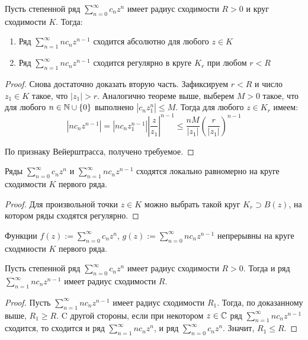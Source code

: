 \begin{proposition}
	Пусть степенной ряд $\sum_{n=0}^\infty c_nz^n$ имеет радиус сходимости $R > 0$ и круг сходимости $K$. Тогда:
	\begin{enumerate}
		\item Ряд $\sum_{n = 1}^\infty nc_nz^{n-1}$ сходится абсолютно для любого $z \in K$
		\item Ряд $\sum_{n = 1}^\infty nc_nz^{n-1}$ сходится регулярно в круге $K_r$ при любом $r < R$
	\end{enumerate}
\end{proposition}

\begin{proof}
	Снова достаточно доказать вторую часть. Зафиксируем $r < R$ и число $z_1 \in K$ такое, что $|z_1| > r$. Аналогично теореме выше, выберем $M > 0$ такое, что для любого $n \in \mathbb{N} \cup \{0\}$ выполнено $|c_nz_1^n| \le M$. Тогда для любого $z \in K_r$ имеем:
	\[\left|nc_nz^{n-1}\right| = \left|nc_nz_1^{n-1}\right|\left|\frac{z}{z_1}\right|^{n-1} \le \frac{nM}{|z_1|}\left(\frac{r}{|z_1|}\right)^{n-1}\]
	
	По признаку Вейерштрасса, получено требуемое.
\end{proof}

\begin{corollary}
	Ряды $\sum_{n=0}^\infty c_nz^n$ и $\sum_{n = 1}^\infty nc_nz^{n-1}$ сходятся локально равномерно на круге сходимости $K$ первого ряда.
\end{corollary}

\begin{proof}
	Для произвольной точки $z \in K$ можно выбрать такой круг $K_r \supset B(z)$, на котором ряды сходятся регулярно.
\end{proof}

\begin{corollary}
	Функции $f(z) := \sum_{n = 0}^\infty c_nz^n$, $g(z) := \sum_{n = 0}^\infty nc_nz^{n-1}$ непрерывны на круге сходмиости $K$ первого ряда.
\end{corollary}

\begin{corollary}
	Пусть степенной ряд $\sum_{n=0}^\infty c_nz^n$ имеет радиус сходимости $R > 0$. Тогда и ряд $\sum_{n = 1}^\infty nc_nz^{n-1}$ имеет радиус сходимости $R$.
\end{corollary}

\begin{proof}
	Пусть $\sum_{n = 1}^\infty nc_nz^{n-1}$ имеет радиус сходимости $R_1$. Тогда, по доказанному выше, $R_1 \ge R$. C другой стороны, если при некотором $z \in \mathbb{C}$ ряд $\sum_{n = 1}^\infty nc_nz^{n-1}$ сходится, то сходится и ряд $\sum_{n = 1}^\infty nc_nz^n$, и ряд $\sum_{n = 0}^\infty c_nz^n$. Значит, $R_1 \le R$.
\end{proof}

